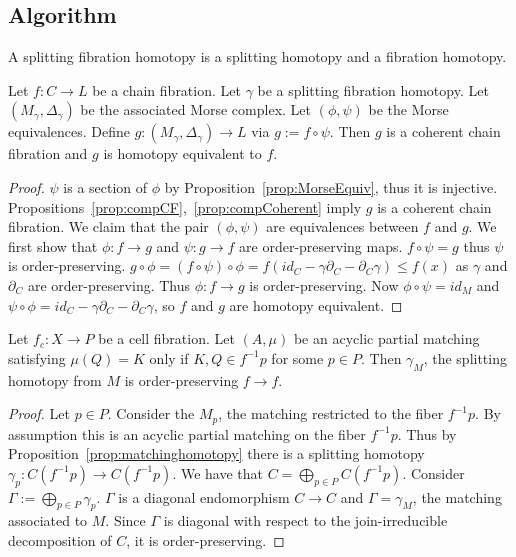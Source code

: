 
\subsection{Algorithm}

A splitting fibration homotopy is a splitting homotopy and a fibration homotopy.

\begin{prop}
Let $f:C\to L$ be a chain fibration.  Let $\gamma$ be a splitting fibration homotopy.  Let $(M_\gamma, \Delta_\gamma)$ be the associated Morse complex.  Let $(\phi,\psi)$ be the Morse equivalences.  Define $g:(M_\gamma,\Delta_\gamma) \to L$ via $g:= f\circ \psi$.  Then $g$ is a coherent chain fibration and $g$ is homotopy equivalent to $f$.  

\end{prop}
\begin{proof}
$\psi$ is a section of $\phi$ by Proposition~\ref{prop:MorseEquiv}, thus it is injective.  Propositions~\ref{prop:compCF},~\ref{prop:compCoherent} imply $g$ is a coherent chain fibration.  We claim that the pair $(\phi,\psi)$ are equivalences between $f$ and $g$.  We first show that $\phi:f\to g$ and $\psi:g\to f$ are order-preserving maps.  $f\circ \psi = g$ thus $\psi$ is order-preserving.  $g\circ \phi = (f\circ \psi)\circ \phi = f(id_C - \gamma\partial_C - \partial_C \gamma) \leq f(x)$ as $\gamma$ and $\partial_C$ are order-preserving. Thus $\phi:f\to g$ is order-preserving.   Now $\phi \circ \psi = id_M$ and $\psi \circ \phi = id_C - \gamma \partial_C - \partial_C\gamma$, so $f$ and $g$ are homotopy equivalent.


\end{proof}

\begin{prop}
Let $f_c:X\to P$ be a cell fibration.  Let $(A,\mu)$ be an acyclic partial matching satisfying $\mu(Q)=K$ only if $K,Q\in f^{-1}p$ for some $p\in P$.  Then $\gamma_M$, the splitting homotopy from $M$ is order-preserving $f\to f$.
\end{prop}


\begin{proof}
Let $p\in P$.  Consider the $M_p$, the matching restricted to the fiber $f^{-1}p$.  By assumption this is an acyclic partial matching on the fiber $f^{-1}p$.  Thus by Proposition~\ref{prop:matchinghomotopy} there is a splitting homotopy $\gamma_p:C(f^{-1}p)\to C(f^{-1}p)$.     We have that $C=\bigoplus_{p\in P} C(f^{-1}p)$.  Consider $\Gamma:= \bigoplus_{p\in P} \gamma_p$.  $\Gamma$ is a diagonal endomorphism $C\to C$ and $\Gamma=\gamma_M$, the matching associated to $M$.  Since $\Gamma$ is diagonal with respect to the join-irreducible decomposition of $C$, it is order-preserving.

\end{proof}


